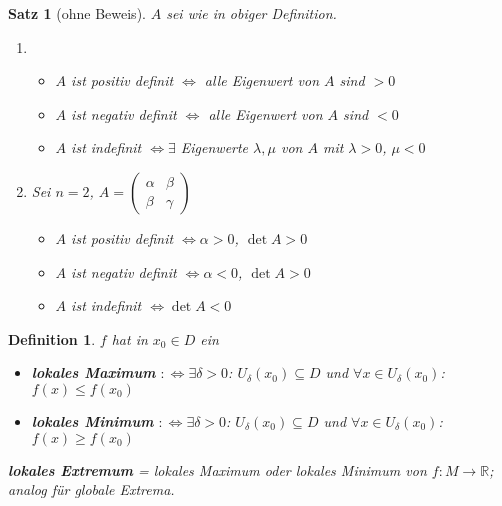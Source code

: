\documentclass[12pt]{extreport} %
\newcommand{\R}{\mathbb{R}}
\theoremstyle{named}
\theoremstyle{nnamed}
\theoremstyle{itshape}
\newtheorem{satz}[unnamedtheorem]{Satz}
\newtheorem*{definition}{Definition}
\theoremstyle{normal}
\begin{document}
\begin{satz}[ohne Beweis] \label{18.9:satz}
	$A$ sei wie in obiger Definition.
	\begin{enumerate}
		\item \begin{itemize}
				\item $A$ ist positiv definit $\iff$ alle Eigenwert von $A$ sind $> 0$
				\item $A$ ist negativ definit $\iff$ alle Eigenwert von $A$ sind $< 0$
				\item $A$ ist indefinit $\iff \exists$ Eigenwerte $\lambda, \mu$ von $A$ mit $\lambda > 0$, $\mu < 0$
			  \end{itemize}
		\item Sei $n = 2$, $A = \begin{pmatrix} \alpha & \beta \\ \beta & \gamma \end{pmatrix}$
			  \begin{itemize}
			  	\item $A$ ist positiv definit $\iff \alpha > 0$, $\det A > 0$
			  	\item $A$ ist negativ definit $\iff \alpha < 0$, $\det A > 0$
			  	\item $A$ ist indefinit $\iff \det A < 0$
			  \end{itemize}
	\end{enumerate}
\end{satz}

  
\begin{definition}
	$f$ hat in $x_{0} \in D$ ein 
	\begin{itemize}
		\item \textbf{lokales Maximum} $:\iff \exists \delta > 0$: $U_{\delta}(x_{0}) \subseteq D$ und $\forall x \in U_{\delta}(x_{0})$: $f(x) \leq f(x_{0})$
		\item \textbf{lokales Minimum} $:\iff \exists \delta > 0$: $U_{\delta}(x_{0}) \subseteq D$ und $\forall x \in U_{\delta}(x_{0})$: $f(x) \geq f(x_{0})$
	\end{itemize}
	\textbf{lokales Extremum} = lokales Maximum oder lokales Minimum von $f \colon M \rightarrow \R$; analog für globale Extrema.
\end{definition}
\end{document}
